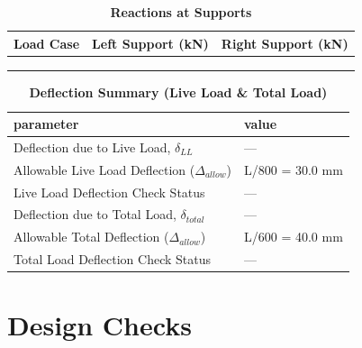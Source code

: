 \documentclass[12pt,a4paper]{report}
\numberwithin{table}{chapter}
\numberwithin{figure}{chapter}
\begin{document}
\vspace{1em}
\begin{longtable}{|>{\centering\arraybackslash}p{5.2cm}|>{\centering\arraybackslash}p{5.2cm}|>{\centering\arraybackslash}p{5.2cm}|}
\caption{\textbf{Reactions at Supports}}
\hline
\textbf{Load Case} & \textbf{Left Support (kN)} & \textbf{Right Support (kN)} \\[6pt]
\hline
 &  &  \\[6pt]
\hline
 &  &  \\[6pt]
\hline
 &  &  \\[6pt]
\hline
\end{longtable}

\vspace{1em}
\begin{longtable}{|L{7cm}|p{8.5cm}|}
\caption{\textbf{Deflection Summary (Live Load \& Total Load)}}
\hline
\textbf{parameter} & \textbf{value} \\
\hline
\textnormal{Deflection due to Live Load, $\delta_{LL}$} & --- \\[6pt]
\hline
\textnormal{Allowable Live Load Deflection ($\Delta_{allow}$)} & L/800 = 30.0 mm \\[6pt]
\hline
\textnormal{Live Load Deflection Check Status} & --- \\[6pt]
\hline
\textnormal{Deflection due to Total Load, $\delta_{total}$} & --- \\[6pt]
\hline
\textnormal{Allowable Total Deflection ($\Delta_{allow}$)} & L/600 = 40.0 mm \\[6pt]
\hline
\textnormal{Total Load Deflection Check Status} & --- \\[6pt]
\hline
\end{longtable}

\vspace{1em}
\noindent
\noindent{}
\noindent{}
\noindent{}


\chapter{Design Checks}
\end{document}
